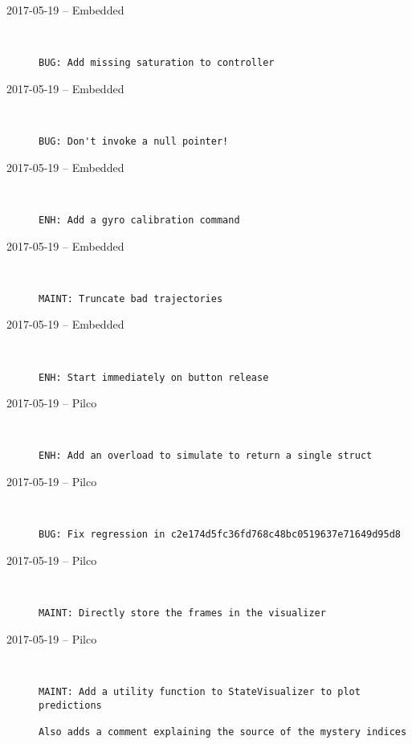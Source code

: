 \begin{description}
  \item[2017-05-19 -- Embedded] \hfill \
\begin{lstlisting}
BUG: Add missing saturation to controller
\end{lstlisting}


  \item[2017-05-19 -- Embedded] \hfill \
\begin{lstlisting}
BUG: Don't invoke a null pointer!
\end{lstlisting}


  \item[2017-05-19 -- Embedded] \hfill \
\begin{lstlisting}
ENH: Add a gyro calibration command
\end{lstlisting}


  \item[2017-05-19 -- Embedded] \hfill \
\begin{lstlisting}
MAINT: Truncate bad trajectories
\end{lstlisting}


  \item[2017-05-19 -- Embedded] \hfill \
\begin{lstlisting}
ENH: Start immediately on button release
\end{lstlisting}


  \item[2017-05-19 -- Pilco] \hfill \
\begin{lstlisting}
ENH: Add an overload to simulate to return a single struct
\end{lstlisting}


  \item[2017-05-19 -- Pilco] \hfill \
\begin{lstlisting}
BUG: Fix regression in c2e174d5fc36fd768c48bc0519637e71649d95d8
\end{lstlisting}


  \item[2017-05-19 -- Pilco] \hfill \
\begin{lstlisting}
MAINT: Directly store the frames in the visualizer
\end{lstlisting}


  \item[2017-05-19 -- Pilco] \hfill \
\begin{lstlisting}
MAINT: Add a utility function to StateVisualizer to plot predictions

Also adds a comment explaining the source of the mystery indices
\end{lstlisting}



\end{description}
